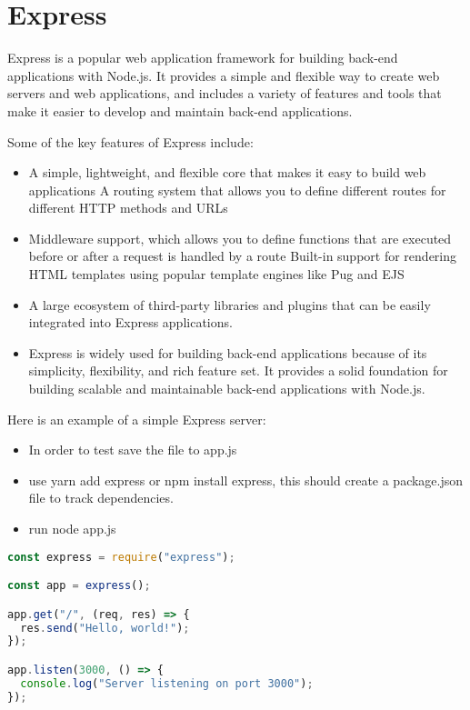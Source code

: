 {\section{Express}
Express is a popular web application framework for building back-end applications with Node.js. It provides a simple and flexible way to create web servers and web applications, and includes a variety of features and tools that make it easier to develop and maintain back-end applications.

Some of the key features of Express include:
\begin{itemize}
\item A simple, lightweight, and flexible core that makes it easy to build web applications
A routing system that allows you to define different routes for different HTTP methods and URLs
\item Middleware support, which allows you to define functions that are executed before or after a request is handled by a route
Built-in support for rendering HTML templates using popular template engines like Pug and EJS

\item A large ecosystem of third-party libraries and plugins that can be easily integrated into Express applications.
\item Express is widely used for building back-end applications because of its simplicity, flexibility, and rich feature set. It provides a solid foundation for building scalable and maintainable back-end applications with Node.js.
\end{itemize}

Here is an example of a simple Express server:

\begin{itemize}
\item In order to test save the file to app.js 
\item use yarn add express or npm install express, this should create a package.json file to track dependencies.
\item run node app.js
\end{itemize}

\begin{lstlisting}[language=Javascript, caption=Simple Express Server]
const express = require("express");

const app = express();

app.get("/", (req, res) => {
  res.send("Hello, world!");
});

app.listen(3000, () => {
  console.log("Server listening on port 3000");
});
\end{lstlisting}

}
